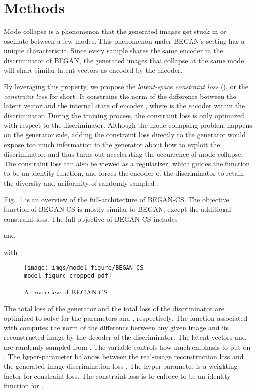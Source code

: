 \documentclass[runningheads]{llncs}
\begin{document}
\section{Methods}

    Mode collapse is a phenomenon that the generated images get stuck in or oscillate between a few modes. This phenomenon under BEGAN's setting has a unique characteristic. Since every sample shares the same encoder in the discriminator of BEGAN, the generated images that collapse at the same mode will share similar latent vectors as encoded by the encoder.
    
    By leveraging this property, we propose the \emph{latent-space constraint loss} (), or the \emph{constraint loss} for short. It constrains the norm of the difference between the latent vector  and the internal state of encoder , where  is the encoder within the discriminator. During the training process, the constraint loss is only optimized with respect to the discriminator. Although the mode-collapsing problem happens on the generator side, adding the constraint loss directly to the generator would expose too much information to the generator about how to exploit the discriminator, and thus turns out accelerating the occurrence of mode collapse. The constraint loss can also be viewed as a regularizer, which guides the function  to be an identity function, and forces the encoder of the discriminator to retain the diversity and uniformity of randomly sampled .
    
    
    Fig.~\ref{fig:full-architecture} is an overview of the full-architecture of BEGAN-CS. The objective function of BEGAN-CS is mostly similar to BEGAN, except the additional constraint loss. The full objective of BEGAN-CS includes
    
\noindent and

\noindent with

    
    \begin{figure}[!t]
        \texttt{[image: imgs/model\_figure/BEGAN-CS-model\_figure\_cropped.pdf]}
        \caption{An overview of BEGAN-CS.}
        \label{fig:full-architecture}
    \end{figure}
    
    \noindent
    The total loss  of the generator and the total loss  of the discriminator are optimized to solve for the parameters  and , respectively. The function  associated with  computes the norm of the difference between any given image  and its reconstructed image  by the decoder of the discriminator. The latent vectors  and  are randomly sampled from . The variable  controls how much emphasis to put on . The hyper-parameter  balances between the real-image reconstruction loss  and the generated-image discrimination loss . The hyper-parameter  is a weighting factor for constraint loss. The constraint loss  is to enforce  to be an identity function for .
    
\end{document}

